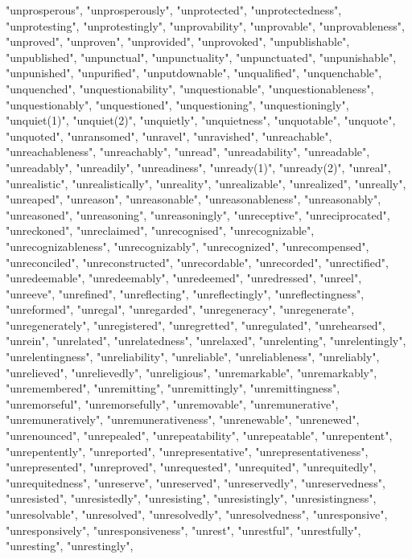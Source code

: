 "unprosperous",
"unprosperously",
"unprotected",
"unprotectedness",
"unprotesting",
"unprotestingly",
"unprovability",
"unprovable",
"unprovableness",
"unproved",
"unproven",
"unprovided",
"unprovoked",
"unpublishable",
"unpublished",
"unpunctual",
"unpunctuality",
"unpunctuated",
"unpunishable",
"unpunished",
"unpurified",
"unputdownable",
"unqualified",
"unquenchable",
"unquenched",
"unquestionability",
"unquestionable",
"unquestionableness",
"unquestionably",
"unquestioned",
"unquestioning",
"unquestioningly",
"unquiet(1)",
"unquiet(2)",
"unquietly",
"unquietness",
"unquotable",
"unquote",
"unquoted",
"unransomed",
"unravel",
"unravished",
"unreachable",
"unreachableness",
"unreachably",
"unread",
"unreadability",
"unreadable",
"unreadably",
"unreadily",
"unreadiness",
"unready(1)",
"unready(2)",
"unreal",
"unrealistic",
"unrealistically",
"unreality",
"unrealizable",
"unrealized",
"unreally",
"unreaped",
"unreason",
"unreasonable",
"unreasonableness",
"unreasonably",
"unreasoned",
"unreasoning",
"unreasoningly",
"unreceptive",
"unreciprocated",
"unreckoned",
"unreclaimed",
"unrecognised",
"unrecognizable",
"unrecognizableness",
"unrecognizably",
"unrecognized",
"unrecompensed",
"unreconciled",
"unreconstructed",
"unrecordable",
"unrecorded",
"unrectified",
"unredeemable",
"unredeemably",
"unredeemed",
"unredressed",
"unreel",
"unreeve",
"unrefined",
"unreflecting",
"unreflectingly",
"unreflectingness",
"unreformed",
"unregal",
"unregarded",
"unregeneracy",
"unregenerate",
"unregenerately",
"unregistered",
"unregretted",
"unregulated",
"unrehearsed",
"unrein",
"unrelated",
"unrelatedness",
"unrelaxed",
"unrelenting",
"unrelentingly",
"unrelentingness",
"unreliability",
"unreliable",
"unreliableness",
"unreliably",
"unrelieved",
"unrelievedly",
"unreligious",
"unremarkable",
"unremarkably",
"unremembered",
"unremitting",
"unremittingly",
"unremittingness",
"unremorseful",
"unremorsefully",
"unremovable",
"unremunerative",
"unremuneratively",
"unremunerativeness",
"unrenewable",
"unrenewed",
"unrenounced",
"unrepealed",
"unrepeatability",
"unrepeatable",
"unrepentent",
"unrepentently",
"unreported",
"unrepresentative",
"unrepresentativeness",
"unrepresented",
"unreproved",
"unrequested",
"unrequited",
"unrequitedly",
"unrequitedness",
"unreserve",
"unreserved",
"unreservedly",
"unreservedness",
"unresisted",
"unresistedly",
"unresisting",
"unresistingly",
"unresistingness",
"unresolvable",
"unresolved",
"unresolvedly",
"unresolvedness",
"unresponsive",
"unresponsively",
"unresponsiveness",
"unrest",
"unrestful",
"unrestfully",
"unresting",
"unrestingly",

